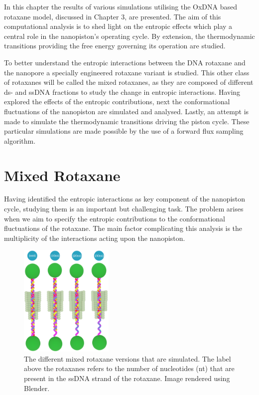 \noindent In this chapter the results of various simulations utilising the OxDNA based
rotaxane model, discussed in Chapter 3, are presented. The aim of this computational
analysis is to shed light on
the entropic effects which play a central role in the nanopiston's operating cycle. By
extension, the thermodynamic transitions providing the free energy governing its
operation are studied.

To better understand the entropic interactions between the DNA rotaxane and the nanopore
a specially engineered rotaxane variant is studied. This other class of rotaxanes will be
called the mixed rotaxanes, as they are composed of different ds- and ssDNA fractions to
study the change in entropic interactions. Having explored the effects of the
entropic contributions, next the conformational fluctuations of the nanopiston are
simulated and analysed. Lastly, an attempt is made to simulate the thermodynamic
transitions driving the piston cycle. These particular simulations are made possible
by the use of a forward flux sampling algorithm.


\section{Mixed Rotaxane}



Having identified the entropic interactions as key component of the nanopiston cycle,
studying them is an important but challenging task. The problem arises when we aim to
specify the entropic contributions to the conformational fluctuations of the rotaxane.
The
main factor complicating this analysis is the multiplicity of the interactions acting
upon the nanopiston.

\begin{figure}
  \vspace{-0.8cm}
  \begin{center}
    \includegraphics[width=0.4\textwidth]{Figures/mixed.png}
    \caption[Figure of the simulated mixed rotaxanes.]{{\small The different mixed
    rotaxane
    versions that are simulated. The label above the rotaxanes refers to the number of
    nucleotides (nt) that are present in the ssDNA strand of the rotaxane. Image rendered
    using Blender.\cite{blender}}}
  \label{fig:mixed}
\end{center}
\end{figure}


